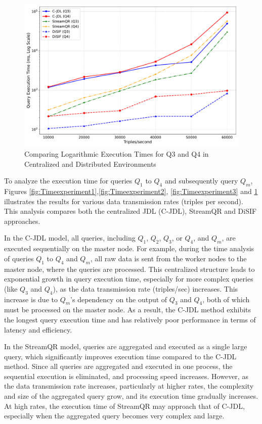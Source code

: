 \documentclass[5p,times]{elsarticle}
\begin{document}
\begin{itemize}
\begin{figure}[t] %
  \centering
  \includegraphics[width=0.8\columnwidth]{Time_execution_Q1Q2_StreamQR_NonLogarithmicAdjustment_LogScale_Q3Q4.pdf}
  \caption{Comparing Logarithmic Execution Times for Q3 and Q4 in Centralized and Distributed Environments}
  \label{fig:Timeexperiment4}
\end{figure}






To analyze the execution time for queries $Q_1$ to $Q_4$ and subsequently query $Q_m$, Figures \ref{fig:Timeexperiment1},\ref{fig:Timeexperiment2},
\ref{fig:Timeexperiment3} and \ref{fig:Timeexperiment4} illustrates the results for various data transmission rates (triples per second).
 This analysis compares both the centralized JDL (C-JDL), StreamQR and DiSIF approaches.


In the C-JDL model, all queries, including $Q_1$, $Q_2$, $Q_3$, or $Q_4$, and $Q_m$, are executed sequentially
 on the master node. For example, during the time analysis of queries $Q_1$ to $Q_4$ and $Q_m$,
  all raw data is sent from the worker nodes to the master node, where the queries are processed.
  This centralized structure leads to exponential growth in query execution time,
   especially for more complex queries (like $Q_3$ and $Q_4$), as the data transmission rate (triples/sec)
    increases. This increase is due to $Q_m$’s dependency on the output of $Q_3$ and $Q_4$,
     both of which must be processed on the master node.
      As a result, the C-JDL method exhibits the longest query execution time and has relatively poor
       performance in terms of latency and efficiency.

In the StreamQR model, queries are aggregated and executed as a single large query,
 which significantly improves execution time compared to the C-JDL method.
  Since all queries are aggregated and executed in one process, the sequential execution
   is eliminated, and processing speed increases. However, as the data transmission rate
    increases, particularly at higher rates, the complexity and size of the aggregated query
     grow, and its execution time gradually increases. At high rates, the execution time
      of StreamQR may approach that of C-JDL, especially when the aggregated query
       becomes very complex and large.



\end{itemize}
\end{document}
